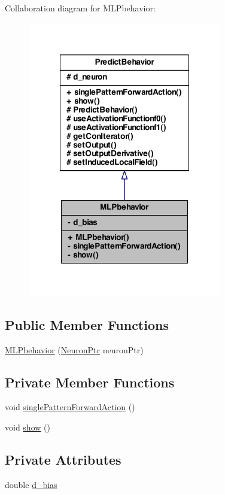 Collaboration diagram for MLPbehavior:\nopagebreak
\begin{figure}[H]
\begin{center}
\leavevmode
\includegraphics[width=240pt]{class_m_l_pbehavior__coll__graph}
\end{center}
\end{figure}
\subsection*{Public Member Functions}
\begin{DoxyCompactItemize}
\item 
\hyperlink{class_m_l_pbehavior_a6e42077295843dd0d9e52f2776f4309e}{MLPbehavior} (\hyperlink{_a_m_o_r_e_8h_ac1ea936c2c7728eb382278131652fef4}{NeuronPtr} neuronPtr)
\end{DoxyCompactItemize}
\subsection*{Private Member Functions}
\begin{DoxyCompactItemize}
\item 
void \hyperlink{class_m_l_pbehavior_a2f91bc3f2e558b92f5beb5e45402e6c7}{singlePatternForwardAction} ()
\item 
void \hyperlink{class_m_l_pbehavior_a32aa885e07e8f4eb33e05afb46040567}{show} ()
\end{DoxyCompactItemize}
\subsection*{Private Attributes}
\begin{DoxyCompactItemize}
\item 
double \hyperlink{class_m_l_pbehavior_a6206785c5c3f838a0538f9f77fa7a25a}{d\_\-bias}
\end{DoxyCompactItemize}

